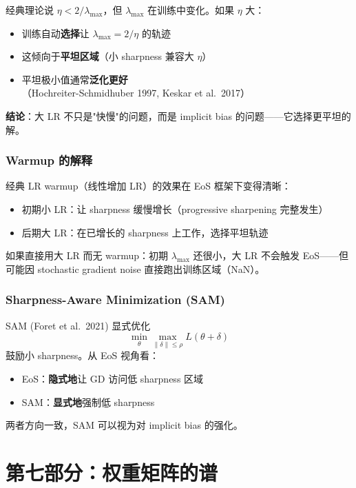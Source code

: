 \documentclass[12pt, a4paper]{ctexart}
\begin{document}
\begin{insight}
经典理论说 $\eta < 2/\lambda_{\max}$，但 $\lambda_{\max}$ 在训练中变化。如果 $\eta$ 大：
\begin{itemize}
\item 训练自动\textbf{选择}让 $\lambda_{\max} = 2/\eta$ 的轨迹
\item 这倾向于\textbf{平坦区域}（小 sharpness 兼容大 $\eta$）
\item 平坦极小值通常\textbf{泛化更好}（Hochreiter-Schmidhuber 1997, Keskar et al.\ 2017）
\end{itemize}

\textbf{结论}：大 LR 不只是"快慢"的问题，而是 implicit bias 的问题——它选择更平坦的解。
\end{insight}

\subsubsection{Warmup 的解释}

经典 LR warmup（线性增加 LR）的效果在 EoS 框架下变得清晰：
\begin{itemize}
\item 初期小 LR：让 sharpness 缓慢增长（progressive sharpening 完整发生）
\item 后期大 LR：在已增长的 sharpness 上工作，选择平坦轨迹
\end{itemize}

如果直接用大 LR 而无 warmup：初期 $\lambda_{\max}$ 还很小，大 LR 不会触发 EoS——但可能因 stochastic gradient noise 直接跑出训练区域（NaN）。

\subsubsection{Sharpness-Aware Minimization (SAM)}

SAM (Foret et al.\ 2021) 显式优化
\[
\min_\theta \max_{\|\delta\| \leq \rho} L(\theta + \delta)
\]
鼓励小 sharpness。从 EoS 视角看：
\begin{itemize}
\item EoS：\textbf{隐式地}让 GD 访问低 sharpness 区域
\item SAM：\textbf{显式地}强制低 sharpness
\end{itemize}
两者方向一致，SAM 可以视为对 implicit bias 的强化。


\section{第七部分：权重矩阵的谱}
\end{document}
